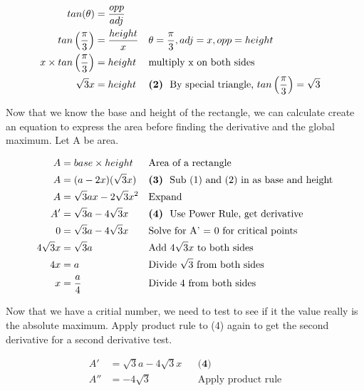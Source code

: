 \documentclass[12pt]{book}
\begin{document}
\begin{enumerate}
\addtolength{\jot}{-0.6em}
\begin{align*}
    tan(\theta) &= \dfrac{opp}{adj} \\
    tan \left( \dfrac{\pi}{3} \right) &= \dfrac{height}{x} && \theta = \dfrac{\pi}{3}, adj = x, opp=height \\
    x \times tan \left( \dfrac{\pi}{3} \right) &= height && \text{multiply x on both sides} \\
    \sqrt3 x&= height && \textbf{(2)} \text{\space \space By special triangle, } tan \left( \dfrac{\pi}{3} \right) = \sqrt3 \\
\end{align*}

\newpage

Now that we know the base and height of the rectangle, we can calculate 
create an equation to express the area before finding the derivative and 
the global maximum. Let A be area.

\addtolength{\jot}{-0.6em}
\begin{align*}
    A &= base \times height && \text{Area of a rectangle}\\
    A &= (a - 2x)(\sqrt3x) && \textbf{(3)} \text{\space \space Sub (1) and (2) in as base and height} \\
    A &= \sqrt3ax-2\sqrt3x^2 && \text{Expand} \\
    A' &=  \sqrt3a-4\sqrt3x && \textbf{(4)} \text{\space \space Use Power Rule, get derivative} \\
    0 &=  \sqrt3a-4\sqrt3x && \text{Solve for A' = 0 for critical points}\\
    4\sqrt3x &=  \sqrt3a && \text{Add } 4\sqrt3x \text{ to both sides} \\
    4x &=  a && \text{Divide } \sqrt3 \text{ from both sides} \\
    x &= \dfrac{a}{4} && \text{Divide } 4 \text{ from both sides} \\  
\end{align*}

Now that we have a critial number, we need to test to see 
if it the value really is the absolute maximum. Apply product rule 
to (4) again to get the second derivative for a second derivative test.

\addtolength{\jot}{-0.6em}
\begin{align*}
    A' &=  \sqrt3a-4\sqrt3x && \textbf{(4)} \\
    A'' &=  -4\sqrt3 && \text{Apply product rule}\\
\end{align*}


\end{enumerate}
\end{document}
